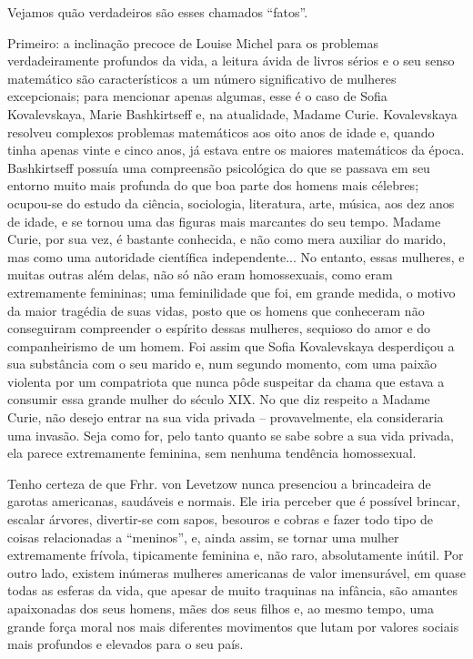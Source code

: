 Vejamos quão verdadeiros são esses chamados ``fatos''.

Primeiro: a inclinação precoce de Louise Michel para os problemas
verdadeiramente profundos da vida, a leitura ávida de livros sérios e o
seu senso matemático são característicos a um número significativo de
mulheres excepcionais; para mencionar apenas algumas, esse é o caso de
Sofia Kovalevskaya, Marie Bashkirtseff e, na atualidade, Madame Curie.
Kovalevskaya resolveu complexos problemas matemáticos aos oito anos de
idade e, quando tinha apenas vinte e cinco anos, já estava entre os
maiores matemáticos da época. Bashkirtseff possuía uma compreensão
psicológica do que se passava em seu entorno muito mais profunda do que
boa parte dos homens mais célebres; ocupou-se do estudo da ciência,
sociologia, literatura, arte, música, aos dez anos de idade, e se tornou
uma das figuras mais marcantes do seu tempo. Madame Curie, por sua vez,
é bastante conhecida, e não como mera auxiliar do marido, mas como uma
autoridade científica independente... No entanto, essas mulheres, e
muitas outras além delas, não só não eram homossexuais, como eram
extremamente femininas; uma feminilidade que foi, em grande medida, o
motivo da maior tragédia de suas vidas, posto que os homens que
conheceram não conseguiram compreender o espírito dessas mulheres,
sequioso do amor e do companheirismo de um homem. Foi assim que Sofia
Kovalevskaya desperdiçou a sua substância com o seu marido e, num
segundo momento, com uma paixão violenta por um compatriota que nunca
pôde suspeitar da chama que estava a consumir essa grande mulher do
século XIX. No que diz respeito a Madame Curie, não desejo entrar na sua
vida privada -- provavelmente, ela consideraria uma invasão. Seja como
for, pelo tanto quanto se sabe sobre a sua vida privada, ela parece
extremamente feminina, sem nenhuma tendência homossexual.

Tenho certeza de que Frhr. von Levetzow nunca presenciou a brincadeira
de garotas americanas, saudáveis e normais. Ele iria perceber que é
possível brincar, escalar árvores, divertir-se com sapos, besouros e
cobras e fazer todo tipo de coisas relacionadas a ``meninos'', e, ainda
assim, se tornar uma mulher extremamente frívola, tipicamente feminina
e, não raro, absolutamente inútil. Por outro lado, existem inúmeras
mulheres americanas de valor imensurável, em quase todas as esferas da
vida, que apesar de muito traquinas na infância, são amantes apaixonadas
dos seus homens, mães dos seus filhos e, ao mesmo tempo, uma grande
força moral nos mais diferentes movimentos que lutam por valores sociais
mais profundos e elevados para o seu país.

